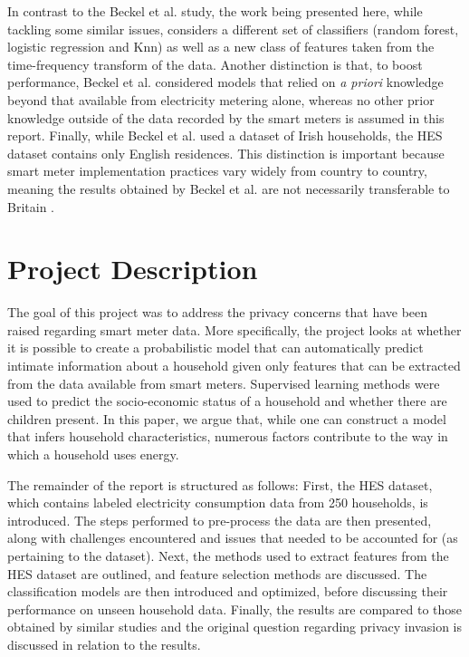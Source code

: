 In contrast to the Beckel et al. study, the work being presented here, while tackling some similar issues, considers a different set of classifiers (random forest, logistic regression and Knn) as well as a new class of features taken from the time-frequency transform of the data. Another distinction is that, to boost performance, Beckel et al. considered models that relied on \textit{a priori} knowledge beyond that available from electricity metering alone, whereas no other prior knowledge outside of the data recorded by the smart meters is assumed in this report. Finally, while Beckel et al. used a dataset of Irish households, the HES dataset contains only English residences. This distinction is important because smart meter implementation practices vary widely from country to country, meaning the results obtained by Beckel et al. are not necessarily transferable to Britain \cite{Anderson,Wilhite}. 


\section{Project Description}
The goal of this project was to address the privacy concerns that have been raised regarding smart meter data. More specifically, the project looks at whether it is possible to create a probabilistic model that can automatically predict intimate information about a household given only features that can be extracted from the data available from smart meters. Supervised learning methods were used to predict the socio-economic status of a household and whether there are children present. In this paper, we argue that, while one can construct a model that infers household characteristics, numerous factors contribute to the way in which a household uses energy.

The remainder of the report is structured as follows:
First, the HES dataset, which contains labeled electricity consumption data from 250 households, is introduced.   The steps performed to pre-process the data are then presented, along with challenges encountered and issues that needed to be accounted for (as pertaining to the dataset). Next, the methods used to extract features from the HES dataset are outlined, and feature selection methods are discussed.  The classification models are then introduced and optimized, before discussing their performance on unseen household data. Finally, the results are compared to those obtained by similar studies and the original question regarding privacy invasion is discussed in relation to the results.